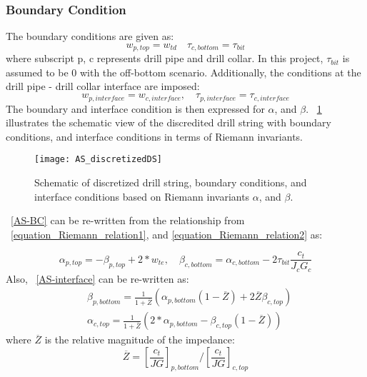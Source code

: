 \subsubsection{Boundary Condition}
The boundary conditions are given as:
\begin{equation}\label{AS-BC}
  w_{p,top} = w_{td} \quad \tau_{c,bottom} = \tau_{bit}
\end{equation}
where subscript p, c represents drill pipe and drill collar. In this project, $\tau_{bit}$ is assumed to be 0 with the off-bottom scenario. 
Additionally, the conditions at the drill pipe - drill collar interface are imposed:
\begin{equation}\label{AS-interface}
  w_{p,interface} = w_{c,interface}, \quad \tau_{p,interface} = \tau_{c,interface}
\end{equation}
The boundary and interface condition is then expressed for $\alpha$, and $\beta$. \figurename~\ref{AS_discretizeDS} illustrates the schematic view of the discredited drill string with boundary conditions, and interface conditions in terms of Riemann invariants.
\begin{figure}
  \centering
  \texttt{[image: AS\_discretizedDS]}
  \caption[Schematic of discretized drill string and boundary conditions]{Schematic of discretized drill string, boundary conditions, and interface conditions based on Riemann invariants $\alpha$, and $\beta$.}\label{AS_discretizeDS}
\end{figure}

\equationname~\ref{AS-BC} can be re-written from the relationship from \equationname~\ref{equation_Riemann_relation1}, and \ref{equation_Riemann_relation2} as:

\begin{equation}\label{AS-riemannBC}
  \alpha_{p,top} = -\beta_{p,top} + 2*w_{te}, \quad \beta_{c,bottom} = \alpha_{c,bottom} - 2\tau_{bit} \frac{c_t}{J_c G_c}
\end{equation}
Also, \equationname~\ref{AS-interface} can be re-written as:
\begin{equation}\label{AS-riemanninterface}
\begin{split}
    & \beta_{p,bottom} = \frac{1}{1+\overline{Z}}\left(\alpha_{p,bottom}(1-\overline{Z}) + 2\overline{Z}\beta_{c,top} \right) \\
    & \alpha_{c,top} = \frac{1}{1+\overline{Z}}\left(2*\alpha_{p,bottom} - \beta_{c,top}(1-\overline{Z})\right)
\end{split}
\end{equation}
where $\overline{Z}$ is the relative magnitude of the impedance:
\begin{equation}\label{AS_Zbar}
  \overline{Z} = \left[\frac{c_t}{JG}\right]_{p,bottom} / \left[\frac{c_t}{JG}\right]_{c,top}
\end{equation}

